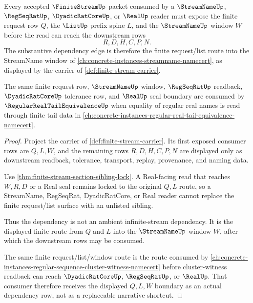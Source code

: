 \begin{theorem}
\label{thm:finite-stream-streamname-dependency-route}
Every accepted $\FiniteStreamUp$ packet consumed by a $\StreamNameUp$, $\RegSeqRatUp$, $\DyadicRatCoreUp$, or $\RealUp$ reader must expose the finite request row $Q$, the $\ListUp$ prefix spine $L$, and the $\StreamNameUp$ window $W$ before the read can reach the downstream rows
$$
R,D,H,C,P,N.
$$
The substantive dependency edge is therefore the finite request/list route into the StreamName window of \autoref{ch:concrete-instances-streamname-namecert}, as displayed by the carrier of \autoref{def:finite-stream-carrier}.
\end{theorem}
The same finite request row, $\StreamNameUp$ window, $\RegSeqRatUp$ readback, $\DyadicRatCoreUp$ tolerance row, and $\RealUp$ seal boundary are consumed by $\RegularRealTailEquivalenceUp$ when equality of regular real names is read through finite tail data in \autoref{ch:concrete-instances-regular-real-tail-equivalence-namecert}.
\begin{proof}
Project the carrier of \autoref{def:finite-stream-carrier}. Its first exposed consumer rows are $Q,L,W$, and the remaining rows $R,D,H,C,P,N$ are displayed only as downstream readback, tolerance, transport, replay, provenance, and naming data.

Use \autoref{thm:finite-stream-section-sibling-lock}. A Real-facing read that reaches $W,R,D$ or a Real seal remains locked to the original $Q,L$ route, so a StreamName, RegSeqRat, DyadicRatCore, or Real reader cannot replace the finite request/list surface with an unlisted sibling.

Thus the dependency is not an ambient infinite-stream dependency. It is the displayed finite route from $Q$ and $L$ into the $\StreamNameUp$ window $W$, after which the downstream rows may be consumed.

The same finite request/list/window route is the route consumed by \autoref{ch:concrete-instances-regular-sequence-cluster-witness-namecert} before cluster-witness readback can reach $\DyadicRatCoreUp$, $\RegSeqRatUp$, or $\RealUp$. That consumer therefore receives the displayed $Q,L,W$ boundary as an actual dependency row, not as a replaceable narrative shortcut.
\end{proof}

